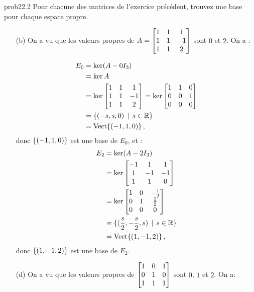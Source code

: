 \bigskip
\begin{sol}{prob22.2}
Pour chacune des matrices de l'exercice précédent, trouvez une base pour chaque espace propre.

\soln 

\begin{enumerate}[]
\item[(b)] On a vu que les valeurs propres de $A=\bmatrix 
1&1&1\\1&1&-1\\1&1&2 \endbmatrix $ sont $0$ et $2$.  On a :

\begin{align*}E_0&=\ker(A-0I_3)\\
&=\ker A\\
&=\ker\bmatrix 
1&1&1\\1&1&-1\\1&1&2 \endbmatrix =\ker \bmatrix 
 1 & 1 & 0 \\
 0 & 0 & 1 \\
 0 & 0 & 0 \endbmatrix\\
& =\set{(-s,s,0)\st s\in \R}\\
&=\sp{(-1,1,0)}\,, \end{align*}
 donc $\{(-1,1,0)\} $ est une base de $E_0$, et :
\begin{align*}
E_2&=\ker(A-2I_3)\\
& =\ker\bmatrix 
-1&1&1\\1&-1&-1\\1&1&0 \endbmatrix \\
&=\ker \bmatrix 
 1 & 0 & -\frac{1}{2} \\
 0 & 1 & \frac{1}{2} \\
 0 & 0 & 0 \endbmatrix \\
&=\set{(\frac{s}2,-\frac{s}2,s)\st s\in \R}\\
&=\sp{(1,-1,2)}\,,\end{align*}
donc $\{(1,-1,2)\} $ est une base de $E_2$.

\medskip
\item[(d)] On a vu que les valeurs propres de $\bmatrix 
1&0&1\\0&1&0\\1&1&1 \endbmatrix $ sont $0$, $1$ et $2$. On a:


\end{enumerate}
\end{sol}
